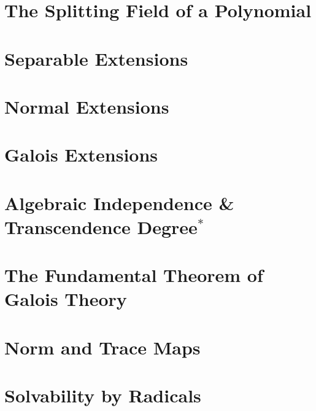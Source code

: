 \documentclass{article}
\begin{document}
\section{The Splitting Field of a Polynomial}

\section{Separable Extensions}

\section{Normal Extensions}

\section{Galois Extensions}

\section{Algebraic Independence \& Transcendence Degree$^{\ast}$}

\section{The Fundamental Theorem of Galois Theory}

\section{Norm and Trace Maps}

\section{Solvability by Radicals}
\end{document}
